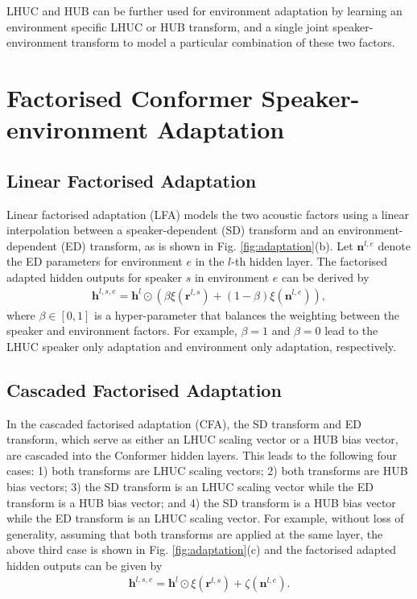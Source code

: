 \documentclass{INTERSPEECH2023}
\begin{document}
LHUC and HUB can be further used for environment adaptation by learning an environment specific LHUC or HUB transform, and a single joint speaker-environment transform to model a particular combination of these two factors.  

\vspace{-0.2cm}
\section{Factorised Conformer Speaker-environment Adaptation}
\vspace{-0.05cm}
\subsection{Linear Factorised Adaptation}
\vspace{-0.05cm}
Linear factorised adaptation (LFA) models the two acoustic factors using a linear interpolation between a speaker-dependent (SD) transform and an environment-dependent (ED) transform, as is shown in Fig. \ref{fig:adaptation}(b). Let $\bm{n}^{l,e}$ denote the ED parameters for environment $e$ in the $l$-th hidden layer. The factorised adapted hidden outputs for speaker $s$ in  environment $e$ can be derived by 
\begin{align}
{\bm{h}}^{l,s,e}= {\bm{h}}^{l} \odot (\beta \xi(\bm{r}^{l,s}) + (1-\beta)\xi(\bm{n}^{l,e})),
\end{align}
where $\beta \in [0, 1]$ is a hyper-parameter that balances the weighting between the speaker and environment factors. For example, $\beta=1$ and $\beta=0$ lead to the LHUC speaker only adaptation and environment only adaptation, respectively. 
\vspace{-0.2cm}
\subsection{Cascaded Factorised Adaptation}
In the cascaded factorised adaptation (CFA), the SD transform and ED transform, which serve as either an LHUC scaling vector or a HUB bias vector, are cascaded into the Conformer hidden layers. This leads to the following four cases: 1) both transforms are LHUC scaling vectors; 2) both transforms are HUB bias vectors; 3) the SD transform is an LHUC scaling vector while the ED transform is a HUB bias vector; and 4) the SD transform is a HUB bias vector while the ED transform is an LHUC scaling vector. For example, without loss of generality, assuming that both transforms are applied at the same layer, the above third case is shown in Fig. \ref{fig:adaptation}(c) and the factorised adapted hidden outputs can be given by  
\begin{align}
{\bm{h}}^{l,s,e}= {\bm{h}}^{l} \odot \xi(\bm{r}^{l,s}) + \zeta(\bm{n}^{l,e}).
\end{align}
\end{document}
